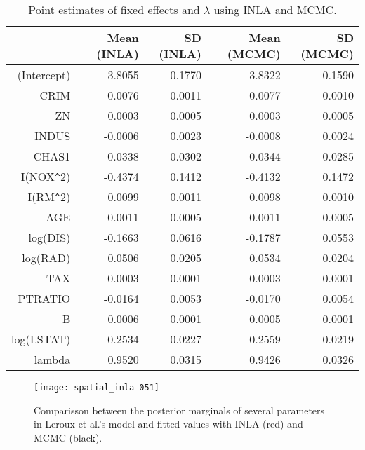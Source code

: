 \documentclass[article]{jss}
\begin{document}

\begin{table}[ht]
\centering
\begin{tabular}{rrrrr}
  \hline
 & Mean (INLA) & SD (INLA) & Mean (MCMC) & SD (MCMC) \\ 
  \hline
(Intercept) & 3.8055 & 0.1770 & 3.8322 & 0.1590 \\ 
  CRIM & -0.0076 & 0.0011 & -0.0077 & 0.0010 \\ 
  ZN & 0.0003 & 0.0005 & 0.0003 & 0.0005 \\ 
  INDUS & -0.0006 & 0.0023 & -0.0008 & 0.0024 \\ 
  CHAS1 & -0.0338 & 0.0302 & -0.0344 & 0.0285 \\ 
  I(NOX\verb|^|2) & -0.4374 & 0.1412 & -0.4132 & 0.1472 \\ 
  I(RM\verb|^|2) & 0.0099 & 0.0011 & 0.0098 & 0.0010 \\ 
  AGE & -0.0011 & 0.0005 & -0.0011 & 0.0005 \\ 
  log(DIS) & -0.1663 & 0.0616 & -0.1787 & 0.0553 \\ 
  log(RAD) & 0.0506 & 0.0205 & 0.0534 & 0.0204 \\ 
  TAX & -0.0003 & 0.0001 & -0.0003 & 0.0001 \\ 
  PTRATIO & -0.0164 & 0.0053 & -0.0170 & 0.0054 \\ 
  B & 0.0006 & 0.0001 & 0.0005 & 0.0001 \\ 
  log(LSTAT) & -0.2534 & 0.0227 & -0.2559 & 0.0219 \\ 
  lambda & 0.9520 & 0.0315 & 0.9426 & 0.0326 \\ 
   \hline
\end{tabular}
\caption{Point estimates of fixed effects and $\lambda$ using INLA and MCMC.} 
\label{tab:leroux}
\end{table}

\begin{figure}[h]
\begin{center}
\texttt{[image: spatial\_inla-051]}
\end{center}
\caption{Comparisson between the posterior marginals of several parameters in 
Leroux et al.'s model and fitted values with INLA (red) and MCMC (black).}
\label{fig:leroux}
\end{figure}
\end{document}
